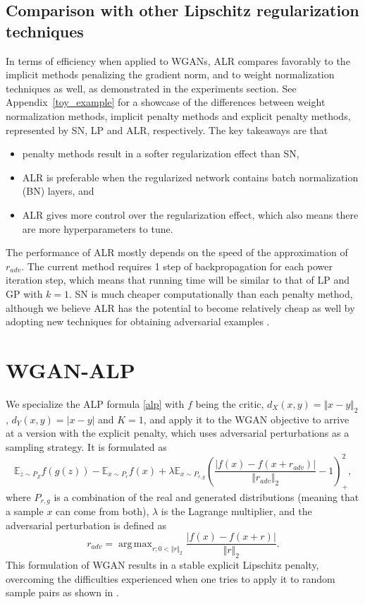 \documentclass{article}
\DeclareMathOperator*{\argmax}{arg\,max}
\begin{document}
\subsection{Comparison with other Lipschitz regularization techniques}
In terms of efficiency when applied to WGANs, ALR compares favorably to the implicit methods penalizing the gradient norm, and to weight normalization techniques as well, as demonstrated in the experiments section. See Appendix~\ref{toy_example} for a showcase of the differences between weight normalization methods, implicit penalty methods and explicit penalty methods, represented by SN, LP and ALR, respectively. The key takeaways are that 
\begin{itemize}
\item penalty methods result in a softer regularization effect than SN, 
\item ALR is preferable when the regularized network contains batch normalization (BN) layers, and 
\item ALR gives more control over the regularization effect, which also means there are more hyperparameters to tune.
\end{itemize}

The performance of ALR mostly depends on the speed of the approximation of $r_{adv}$. The current method requires 1 step of backpropagation for each power iteration step, which means that running time will be similar to that of LP and GP with $k=1$. SN is much cheaper computationally than each penalty method, although we believe ALR has the potential to become relatively cheap as well by adopting new techniques for obtaining adversarial examples \citep{Shafahietal2019}.

\section{WGAN-ALP}
We specialize the ALP formula \eqref{alp} with $f$ being the critic, $d_X(x,y)=\Vert x-y\Vert_2$, $d_Y(x,y)=\vert x-y\vert$ and $K=1$, and apply it to the WGAN objective to arrive at a version with the explicit penalty, which uses adversarial perturbations as a sampling strategy. It is formulated as
\begin{equation} \label{wgan_alp_loss}
\mathbb{E}_{z \sim P_Z}f(g(z)) - \mathbb{E}_{x \sim P_r}f(x)
+\lambda\mathbb{E}_{x \sim P_{r,g}}\left(\frac{\lvert f(x)-f(x+r_{adv})\rvert}{\Vert r_{adv} \Vert_2}-1\right)^2_+,
\end{equation}
where $P_{r,g}$ is a combination of the real and generated distributions (meaning that a sample $x$ can come from both), $\lambda$ is the Lagrange multiplier, and the adversarial perturbation is defined as
\begin{equation} \label{wgan_alp_radv}
r_{adv}=\argmax_{r; 0 < \Vert r \Vert_2}{\frac{\lvert f(x) - f(x+r) \rvert}{\Vert r \Vert_2}}.
\end{equation}
This formulation of WGAN results in a stable explicit Lipschitz penalty, overcoming the difficulties experienced when one tries to apply it to random sample pairs as shown in \citet{Petzkaetal2018}.
\end{document}
